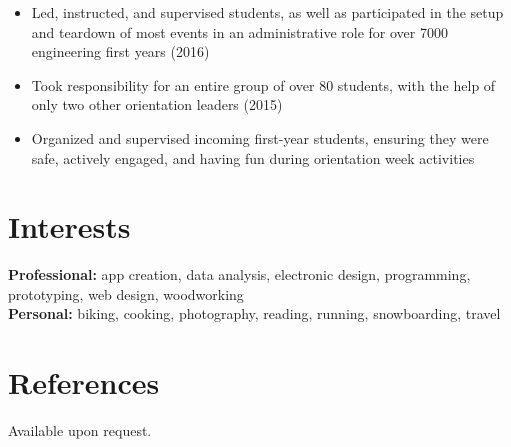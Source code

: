 \documentclass[hidelinks]{kkurucz-cv}
\begin{document}
\begin{entrylist}
{\small{
\begin{itemize}
	\item Led, instructed, and supervised students, as well as participated in the setup and teardown of most events in an administrative role for over 7000 engineering first years (2016)
	\item Took responsibility for an entire group of over 80 students, with the help of only two other orientation leaders (2015)
	\item Organized and supervised incoming first-year students, ensuring they were safe, actively engaged, and having fun during orientation week activities
	\end{itemize}
}
}
{\null}
\end{entrylist}


\section{Interests}

\textbf{Professional:} \small{app creation, data analysis, electronic design, programming, prototyping, web design, woodworking}
\\
\textbf{Personal:}  \small{biking, cooking, photography, reading, running, snowboarding, travel}
\vspace{2mm}

\section{References}

{Available upon request.}
\end{document}
